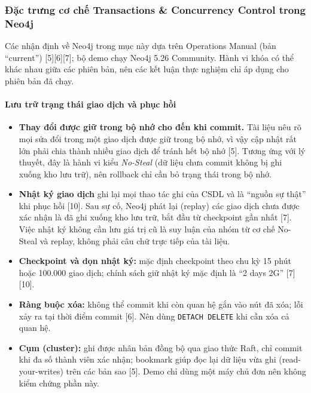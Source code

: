 \subsubsection{Đặc trưng cơ chế Transactions \& Concurrency Control trong Neo4j}
\label{subsubsec:tx-neo4j}

Các nhận định về Neo4j trong mục này dựa trên Operations Manual (bản ``current'') [5][6][7]; bộ demo chạy Neo4j 5.26 Community. Hành vi khóa có thể khác nhau giữa các phiên bản, nên các kết luận thực nghiệm chỉ áp dụng cho phiên bản đã chạy.

\paragraph{Lưu trữ trạng thái giao dịch và phục hồi}\mbox{}

\begin{itemize}
    \item \textbf{Thay đổi được giữ trong bộ nhớ cho đến khi commit.} Tài liệu nêu rõ mọi sửa đổi trong một giao dịch được giữ trong bộ nhớ, vì vậy cập nhật rất lớn phải chia thành nhiều giao dịch để tránh hết bộ nhớ [5]. Tương ứng với lý thuyết, đây là hành vi kiểu \textit{No-Steal} (dữ liệu chưa commit không bị ghi xuống kho lưu trữ), nên rollback chỉ cần bỏ trạng thái trong bộ nhớ.
    \item \textbf{Nhật ký giao dịch} ghi lại mọi thao tác ghi của CSDL và là ``nguồn sự thật'' khi phục hồi [10]. Sau sự cố, Neo4j phát lại (replay) các giao dịch chưa được xác nhận là đã ghi xuống kho lưu trữ, bắt đầu từ checkpoint gần nhất [7]. Việc nhật ký không cần lưu giá trị cũ là suy luận của nhóm từ cơ chế No-Steal và replay, không phải câu chữ trực tiếp của tài liệu.
    \item \textbf{Checkpoint và dọn nhật ký:} mặc định checkpoint theo chu kỳ 15 phút hoặc 100.000 giao dịch; chính sách giữ nhật ký mặc định là ``2 days 2G'' [7][10].
    \item \textbf{Ràng buộc xóa:} không thể commit khi còn quan hệ gắn vào nút đã xóa; lỗi xảy ra tại thời điểm commit [6]. Nên dùng \texttt{DETACH DELETE} khi cần xóa cả quan hệ.
    \item \textbf{Cụm (cluster):} ghi được nhân bản đồng bộ qua giao thức Raft, chỉ commit khi đa số thành viên xác nhận; bookmark giúp đọc lại dữ liệu vừa ghi (read-your-writes) trên các bản sao [5]. Demo chỉ dùng một máy chủ đơn nên không kiểm chứng phần này.
\end{itemize}

